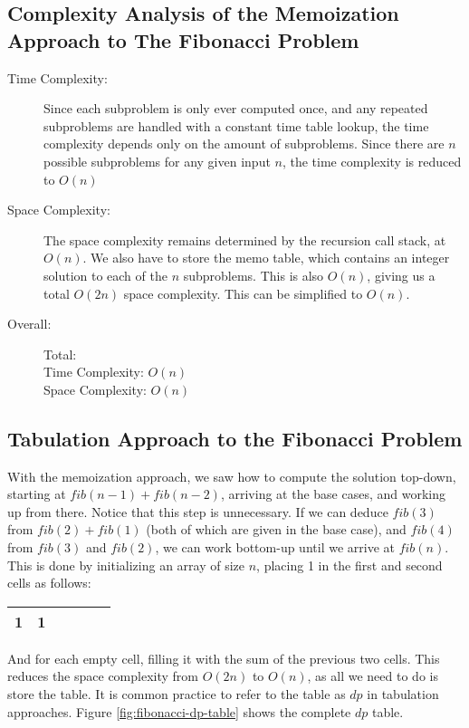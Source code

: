 \subsection{Complexity Analysis of the Memoization Approach to The Fibonacci Problem}

\begin{description}
    \item[Time Complexity:]
        Since each subproblem is only ever computed once, and any repeated subproblems are handled with a constant time table lookup,
        the time complexity depends only on the amount of subproblems.
        Since there are $n$ possible subproblems for any given input $n$,
        the time complexity is reduced to $O(n)$

    \item[Space Complexity:] 
        The space complexity remains determined by the recursion call stack, at $O(n)$.
        We also have to store the memo table, which contains an integer solution to each of the $n$ subproblems.
        This is also $O(n)$, giving us a total $O(2n)$ space complexity.
        This can be simplified to $O(n)$.

    \item[Overall:] Total:\\
        Time Complexity: $O(n)$\\
        Space Complexity: $O(n)$
        
\end{description}
\newpage

\subsection{Tabulation Approach to the Fibonacci Problem}
    
With the memoization approach, we saw how to compute the solution top-down, starting at $fib(n-1) + fib(n-2)$,
arriving at the base cases, and working up from there.
Notice that this step is unnecessary.
If we can deduce $fib(3)$ from $fib(2) + fib(1)$ (both of which are given in the base case),
and $fib(4)$ from $fib(3)$ and $fib(2)$,
we can work bottom-up until we arrive at $fib(n)$.
This is done by initializing an array of size $n$, placing 1 in the first and second cells as follows:
\begin{table}[H]
    \centering
    \begin{tabular}{|c|c|c|c|c|c|}
        \hline
        1 & 1 & \phantom{0} & \phantom{0} & \phantom{0} & \phantom{0} \\
        \hline
    \end{tabular}
\end{table}
And for each empty cell, filling it with the sum of the previous two cells.
This reduces the space complexity from $O(2n)$ to $O(n)$,
as all we need to do is store the table.
It is common practice to refer to the table as $dp$ in tabulation approaches.
Figure \ref{fig:fibonacci-dp-table} shows the complete $dp$ table.

